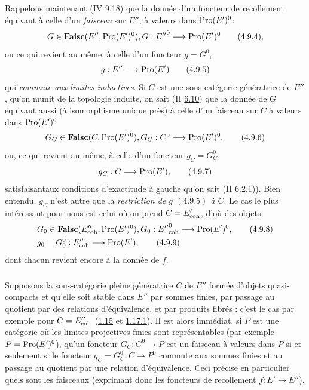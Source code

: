\documentclass[10pt]{../fichiers-configuration-latex/smfart}
\begin{document}
Rappelons maintenant (IV 9.18) que la donnée d'un foncteur de
recollement  équivaut à celle d'un \emph{faisceau} sur $E''$, à
valeurs dans $\operatorname{Pro}(E')^{0}$:
\begin{equation*}
G \in \Ffaisc (E'', \Pro(E')^{0}), G : {E''}^{0} \to \Pro(E')^{0}
\tag{4.9.4}{\quoi},
\end{equation*}
ou ce qui revient au même, à celle d'un foncteur $g = G^{0}$,
\begin{equation*}
g:E''\to \Pro (E')\tag{4.9.5}
\end{equation*}
qui \emph{commute aux limites inductives}. Si $C$ est une
sous-catégorie génératrice de $E''$, qu'on munit de la topologie
induite, on sait (II \hyperref[VI.subsec6.10]{6.10}) que la donnée de $G$ équivaut aussi (à
isomorphisme unique près) à celle d'un faisceau sur $C$ à valeurs dans
$\operatorname{Pro}(E')^{0}$
\begin{equation*}
G_C \in \Ffaisc (C, \Pro(E')^0), G_C : C^{\circ} \to \Pro (E')^{0}{\quoi},\tag{4.9.6}
\end{equation*}
ou, ce qui revient au même, à celle d'un foncteur $g_C = G_C^{0}$,
\begin{equation*}
g_C : C \to \Pro (E'){\quoi},\tag{4.9.7}
\end{equation*}
satisfaisant\pageoriginale aux conditions d'exactitude à gauche qu'on sait (II
6.2.1)). Bien entendu, $g_C$ n'est autre que la \emph{restriction de
$g$ $(4.9.5)$ à $C$}. Le cas le plus intéressant pour nous est celui où
on prend $C = E'_{\mathrm{coh}}$, d'où des objets
\begin{align*}
& G_0 \in \Ffaisc (E''_{\coh}, \Pro (E')^{0}), G_0 : {E''}_{\coh}^0 \to
 \Pro (E')^0 {\quoi},\tag{4.9.8}\\
& g_0 = G^0_0 : E''_{\coh} \to \Pro(E'){\quoi},\tag{4.9.9}
\end{align*}
dont chacun revient encore à la donnée de $f$.

\setcounter{subsubsection}{9}
\subsubsection{}

Supposons la sous-catégorie pleine génératrice $C$ de $E''$ formée
d'objets quasi-compacts et qu'elle soit stable dans $E''$ par sommes
finies, par passage au quotient par des relations d'équivalence, et
par produits fibrés : c'est le cas par exemple pour $C = E''_{\mathrm{coh}}$
(\hyperref[VI.cor1.15]{1.15} et \hyperref[VI.cor1.17.1]{1.17.1}). Il est alors immédiat, si $P$ est une catégorie où
les limites projectives finies sont représentables (par exemple $P =
\operatorname{Pro}(E')^{0}$), qu'un foncteur $G_C : G^{0} \to P$ est un faisceau à
valeurs dans $P$ si et seulement si le foncteur $g_C = G_C^0 : C \to
P^0$ commute aux sommes finies et au passage au quotient par une
relation d'équivalence. Ceci précise en particulier quels sont les
faisceaux  (exprimant donc les foncteurs de recollement $f :
E'\to E''$).
\end{document}
